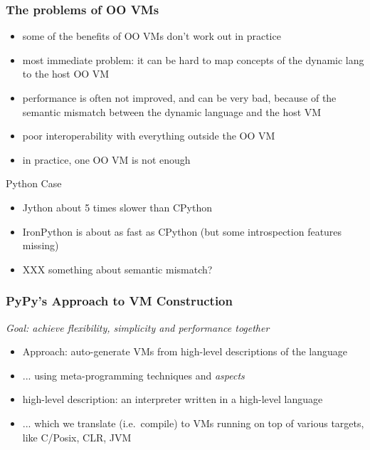 \documentclass[utf8x]{beamer}
\begin{document}
\begin{frame}
  \frametitle{The problems of OO VMs}
  \begin{itemize}
  \item
    some of the benefits of OO VMs don't work out in practice
  \item
    most immediate problem: it can be hard to map
    concepts of the dynamic lang to
    the host OO VM
  \item
    performance is often not improved, and can be very bad, because of the
    semantic mismatch between the dynamic language and the host VM
  \item
    poor interoperability with everything outside the OO VM
  \item
    in practice, one OO VM is not enough
  \end{itemize}
  \pause
  \begin{block}{
    Python Case}
    \begin{itemize}
    \item
      Jython about 5 times slower than CPython
    \item
      IronPython is about as fast as CPython (but some introspection features
      missing)
    \item
      XXX something about semantic mismatch?
    \end{itemize}
  \end{block}
 
\end{frame}

\begin{frame}
  \frametitle{PyPy's Approach to VM Construction}
  \emph{Goal: achieve flexibility, simplicity and performance together}

  \begin{itemize}
  \item
    Approach: auto-generate VMs from high-level descriptions of the language
  \item
    ... using meta-programming techniques and \emph{aspects}
  \item
    high-level description: an interpreter written in a high-level language
  \item
    ... which we translate (i.e.\ compile) to VMs running on top of various
    targets, like C/Posix, CLR, JVM
  \end{itemize}
\end{frame}
\end{document}

